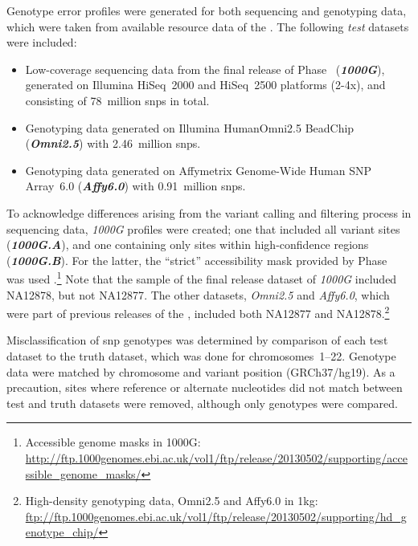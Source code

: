 Genotype error profiles were generated for both sequencing and genotyping data, which were taken from available resource data of the .
The following \emph{test} datasets were included:
\begin{itemize}
\item Low-coverage sequencing data from the final release of  Phase~ (\textbf{\emph{1000G}}), generated on Illumina HiSeq~2000 and HiSeq~2500 platforms (2-4x), and consisting of 78~million \glspl{snp} in total.
\item Genotyping data generated on Illumina HumanOmni2.5 BeadChip (\textbf{\emph{Omni2.5}}) with 2.46~million \glspl{snp}.
\item Genotyping data generated on Affymetrix Genome-Wide Human SNP Array~6.0 (\textbf{\emph{Affy6.0}}) with 0.91~million \glspl{snp}.
\end{itemize}
To acknowledge differences arising from the variant calling and filtering process in sequencing data,  \emph{1000G} profiles were created; one that included all variant sites (\textbf{\emph{1000G.A}}), and one containing only sites within high-confidence regions (\textbf{\emph{1000G.B}}).
For the latter, the ``strict'' accessibility mask provided by  Phase~ was used \citep[see][supplementary information 9.2]{Auton:2015gk}.\footnote{Accessible genome masks in 1000G: \url{http://ftp.1000genomes.ebi.ac.uk/vol1/ftp/release/20130502/supporting/accessible_genome_masks/} }
Note that the sample of the final release dataset of \emph{1000G} included \textsf{NA12878}, but not \textsf{NA12877}.
The other  datasets, \emph{Omni2.5} and \emph{Affy6.0}, which were part of previous releases of the , included both \textsf{NA12877} and \textsf{NA12878}.\footnote{High-density genotyping data, Omni2.5 and Affy6.0 in \gls{1kg}: \url{ftp://ftp.1000genomes.ebi.ac.uk/vol1/ftp/release/20130502/supporting/hd_genotype_chip/} }

%

%

Misclassification of \gls{snp} genotypes was determined by comparison of each test dataset to the truth dataset, which was done for chromosomes~1--22.
Genotype data were matched by chromosome and variant position (GRCh37/hg19).
As a precaution, sites where reference or alternate nucleotides did not match between test and truth datasets were removed, although only genotypes were compared.

